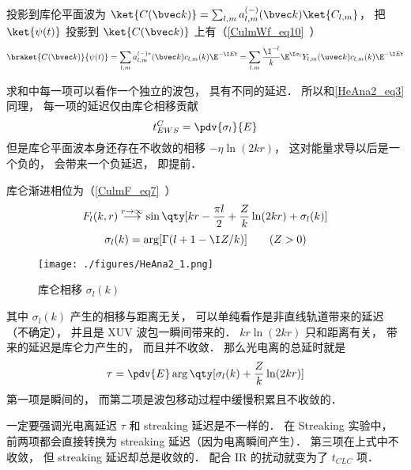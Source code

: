 投影到库伦平面波为 $\ket{C(\bvec k)} = \sum_{l,m} a_{l,m}^{(-)}(\bvec k) \ket{C_{l,m}}$， 把 $\ket{\psi(t)}$ 投影到 $\ket{C(\bvec k)}$ 上有（\autoref{CulmWf_eq10}~）
\begin{equation}
\braket{C(\bvec k)}{\psi(t)} = \sum_{l,m} a_{l,m}^{(-)*}(\bvec k) c_{l,m}(k) \E^{-\I E t} 
= \sum_{l,m} \frac{\I^{-l}}{k} \E^{\I\sigma_l} Y_{l,m} (\uvec k) c_{l,m}(k) \E^{-\I E t}
\end{equation}

求和中每一项可以看作一个独立的波包， 具有不同的延迟． 所以和\autoref{HeAna2_eq3} 同理， 每一项的延迟仅由库仑相移贡献
\begin{equation}
t_{EWS}^C = \pdv{\sigma_l}{E}
\end{equation}
但是库仑平面波本身还存在不收敛的相移 $-\eta\ln (2kr)$， 这对能量求导以后是一个负的， 会带来一个负延迟， 即提前．

库仑渐进相位为（\autoref{CulmF_eq7}~）
\begin{equation}
F_l(k, r) \overset{r\to \infty}{\longrightarrow} \sin\qty[kr - \frac{\pi l}{2} + \frac{Z}{k}\ln(2kr) + \sigma_l(k)] %
\end{equation}
\begin{equation}
\sigma_l(k) = \arg[\Gamma(l+1-\I Z/k)] \qquad (Z > 0)
\end{equation}
\begin{figure}[ht]
\centering
\texttt{[image: ./figures/HeAna2\_1.png]}
\caption{库仑相移 $\sigma_l(k)$} \label{HeAna2_fig1}
\end{figure}
其中 $\sigma_l(k)$ 产生的相移与距离无关， 可以单纯看作是非直线轨道带来的延迟（不确定）， 并且是 XUV 波包一瞬间带来的． $kr\ln(2kr)$ 只和距离有关， 带来的延迟是库仑力产生的， 而且并不收敛． 那么光电离的总延时就是
\begin{equation}\label{HeAna2_eq5}
\tau = \pdv{E} \arg\qty[\sigma_l(k) + \frac{Z}{k}\ln(2kr)] %
\end{equation}
第一项是瞬间的， 而第二项是波包移动过程中缓慢积累且不收敛的．

一定要强调光电离延迟 $\tau$ 和 streaking 延迟是不一样的． 在 Streaking 实验中， 前两项都会直接转换为 streaking 延迟（因为电离瞬间产生）． 第三项在上式中不收敛， 但 streaking 延迟却总是收敛的． 配合 IR 的扰动就变为了 $t_{CLC}$ 项．

